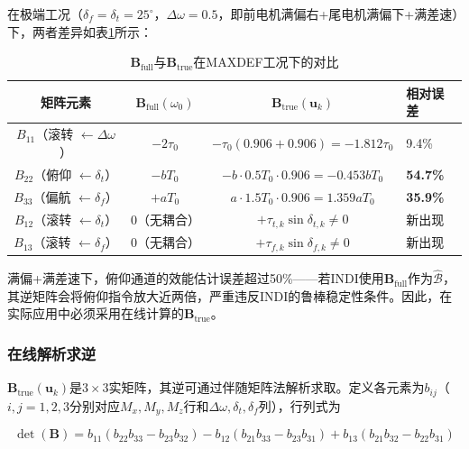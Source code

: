 在极端工况（$\delta_f=\delta_t=25^\circ$，$\Delta\omega=0.5$，即前电机满偏右+尾电机满偏下+满差速）下，两者差异如表\ref{tab:B_comparison}所示：

\begin{table}[H]
\centering
\caption{$\mathbf{B}_{\mathrm{full}}$与$\mathbf{B}_{\mathrm{true}}$在MAXDEF工况下的对比}
\label{tab:B_comparison}
\setlength{\tabcolsep}{4pt}
\small
\begin{tabularx}{\textwidth}{c c c X}
\toprule
\textbf{矩阵元素} & $\mathbf{B}_{\mathrm{full}}(\omega_0)$ & $\mathbf{B}_{\mathrm{true}}(\mathbf{u}_k)$ & \textbf{相对误差} \\
\midrule
$B_{11}$（滚转 $\leftarrow \Delta\omega$） & $-2\tau_0$ & $-\tau_0(0.906+0.906)=-1.812\tau_0$ & 9.4\% \\
$B_{22}$（俯仰 $\leftarrow \delta_t$） & $-b T_0$ & $-b\cdot 0.5T_0\cdot 0.906 = -0.453bT_0$ & \textbf{54.7\%} \\
$B_{33}$（偏航 $\leftarrow \delta_f$） & $+a T_0$ & $a\cdot 1.5T_0\cdot 0.906 = 1.359aT_0$ & \textbf{35.9\%} \\
$B_{12}$（滚转 $\leftarrow \delta_t$） & 0（无耦合） & $+\tau_{t,k}\sin\delta_{t,k} \neq 0$ & 新出现 \\
$B_{13}$（滚转 $\leftarrow \delta_f$） & 0（无耦合） & $+\tau_{f,k}\sin\delta_{f,k} \neq 0$ & 新出现 \\
\bottomrule
\end{tabularx}
\end{table}

满偏+满差速下，俯仰通道的效能估计误差超过50\%——若INDI使用$\mathbf{B}_{\mathrm{full}}$作为$\hat{\mathcal{B}}$，其逆矩阵会将俯仰指令放大近两倍，严重违反INDI的鲁棒稳定性条件\cite{pollack2023robust}。因此，在实际应用中必须采用在线计算的$\mathbf{B}_{\mathrm{true}}$。

\subsubsection{在线解析求逆}

$\mathbf{B}_{\mathrm{true}}(\mathbf{u}_k)$是$3\times3$实矩阵，其逆可通过伴随矩阵法解析求取。定义各元素为$b_{ij}$（$i,j=1,2,3$分别对应$M_x,M_y,M_z$行和$\Delta\omega,\delta_t,\delta_f$列），行列式为

\begin{equation}
    \det(\mathbf{B}) = b_{11}(b_{22}b_{33}-b_{23}b_{32}) - b_{12}(b_{21}b_{33}-b_{23}b_{31}) + b_{13}(b_{21}b_{32}-b_{22}b_{31})
    \label{eq:B_det}
\end{equation}

